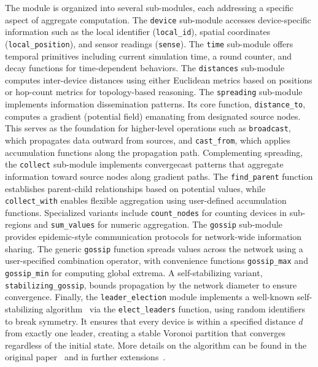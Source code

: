 \documentclass[runningheads]{llncs}
\begin{document}
The module is organized into several sub-modules, each addressing a specific aspect of aggregate computation.
The \texttt{device} sub-module accesses device-specific information such as the local identifier (\texttt{local\_id}), spatial coordinates (\texttt{local\_position}), and sensor readings (\texttt{sense}).
The \texttt{time} sub-module offers temporal primitives including current simulation time, a round counter, and decay functions for time-dependent behaviors.
The \texttt{distances} sub-module computes inter-device distances using either Euclidean metrics based on positions or hop-count metrics for topology-based reasoning.
%
The \texttt{spreading} sub-module implements information dissemination patterns.
Its core function, \texttt{distance\_to}, computes a gradient (potential field) emanating from designated source nodes.
This serves as the foundation for higher-level operations such as \texttt{broadcast}, which propagates data outward from sources,
and \texttt{cast\_from}, which applies accumulation functions along the propagation path.
%
Complementing spreading, the \texttt{collect} sub-module implements convergecast patterns that aggregate information toward source nodes along gradient paths.
The \texttt{find\_parent} function establishes parent-child relationships based on potential values,
while \texttt{collect\_with} enables flexible aggregation using user-defined accumulation functions.
Specialized variants include \texttt{count\_nodes} for counting devices in sub-regions and \texttt{sum\_values} for numeric aggregation.
%
The \texttt{gossip} sub-module provides epidemic-style communication protocols for network-wide information sharing.
The generic \texttt{gossip} function spreads values across the network using a user-specified combination operator,
with convenience functions \texttt{gossip\_max} and \texttt{gossip\_min} for computing global extrema.
A self-stabilizing variant, \texttt{stabilizing\_gossip}, bounds propagation by the network diameter to ensure convergence.
%
Finally, the \texttt{leader\_election} module implements a well-known self-stabilizing algorithm~\cite{DBLP:conf/saso/MoBD18} via the \texttt{elect\_leaders} function, 
using random identifiers to break symmetry. 
It ensures that every device is within a specified distance $d$ from exactly one leader, 
 creating a stable Voronoi partition that converges regardless of the initial state. 
More details on the algorithm can be found in the original paper~\cite{DBLP:conf/saso/MoBD18} and 
 in further extensions~\cite{DBLP:journals/automatica/MoADB22,MO20203336}.
\end{document}
